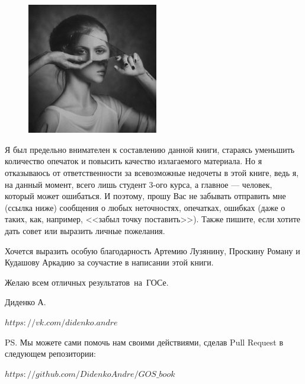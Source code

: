 \mbox{}

\begin{figure}
\vspace{-\baselineskip}
\includegraphics[width=0.51\textwidth]{pictures/love}
\end{figure}
Я был предельно внимателен к составлению данной книги, стараясь уменьшить количество опечаток и повысить качество излагаемого материала. Но я отказываюсь от ответственности за всевозможные недочеты в этой книге, ведь я, на данный момент, всего лишь студент 3-ого курса, а главное --- человек, который может ошибаться. И поэтому, прошу Вас не забывать отправить мне (ссылка ниже) сообщения о любых неточностях, опечатках, ошибках (даже о таких, как, например, <<забыл точку поставить>>). Также пишите, если хотите дать совет или выразить личные пожелания. 

Хочется выразить особую благодарность Артемию Лузянину, Проскину Роману и Кудашову Аркадию за соучастие в написании этой книги.
 
\vspace*{\baselineskip}

Желаю всем отличных результатов~на~ГОСе.

\mbox{}

\noindent Диденко А. 

\noindent\href{https://vk.com/didenko.andre}{$https://vk.com/didenko.andre$}

\mbox{}

\noindent PS. Мы можете сами помочь нам своими действиями, сделав Pull Request в следующем репозитории:

\noindent\href{https://github.com/DidenkoAndre/GOS_book}{$https://github.com/DidenkoAndre/GOS\_book$}